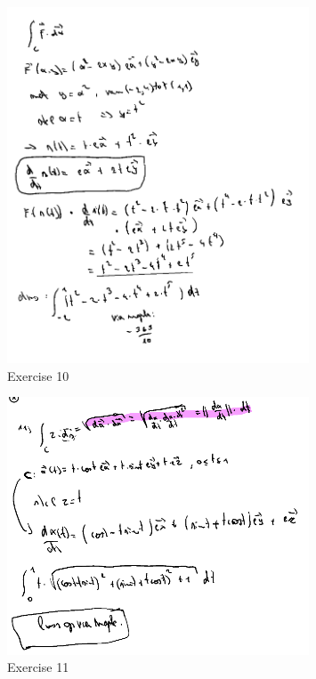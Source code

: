 \documentclass[a4paper]{report}
\begin{document}
\begin{figure}[H]
	\centering
	\includegraphics[width=0.8\textwidth]{assets/huis_6_ex_10.png}
	\caption{Exercise 10}
	\label{fig:huis_6_ex_10}
\end{figure}

\begin{figure}[H]
	\centering
	\includegraphics[width=0.8\textwidth]{assets/huis_6_ex_11.png}
	\caption{Exercise 11}
	\label{fig:huis_6_ex_11}
\end{figure}
\end{document}
